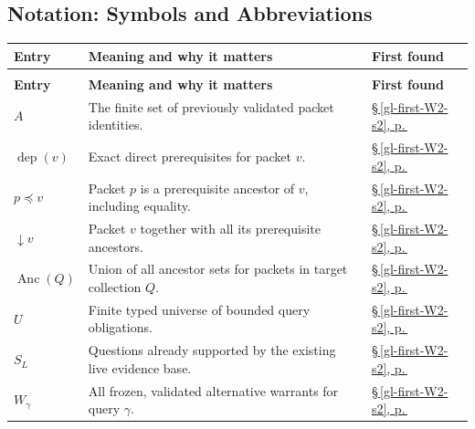\documentclass[10pt,letterpaper]{article}
\theoremstyle{definition}
\theoremstyle{remark}
\begin{document}
\subsection*{Notation: Symbols and Abbreviations}
\begingroup\small\setlength{\tabcolsep}{4pt}\renewcommand{\arraystretch}{1.16}
\begin{longtable}{@{}>{\raggedright\arraybackslash}p{.215\linewidth}>{\raggedright\arraybackslash}p{.585\linewidth}>{\raggedright\arraybackslash}p{.14\linewidth}@{}}
\toprule
\textbf{Entry} & \textbf{Meaning and why it matters} & \textbf{First found} \\
\midrule\endfirsthead
\multicolumn{3}{@{}l}{\footnotesize \emph{Notation: Symbols and Abbreviations (continued)}}\\
\toprule\textbf{Entry} & \textbf{Meaning and why it matters} & \textbf{First found} \\
\midrule\endhead
\bottomrule\endfoot
\textbf{$A$} & The finite set of previously validated packet identities. & \hyperref[gl-first-W2-s2]{\S\,\ref*{gl-first-W2-s2}, p.\,\pageref*{gl-first-W2-s2}} \\
\textbf{$\operatorname{dep}(v)$} & Exact direct prerequisites for packet $v$. & \hyperref[gl-first-W2-s2]{\S\,\ref*{gl-first-W2-s2}, p.\,\pageref*{gl-first-W2-s2}} \\
\textbf{$p\preceq v$} & Packet $p$ is a prerequisite ancestor of $v$, including equality. & \hyperref[gl-first-W2-s2]{\S\,\ref*{gl-first-W2-s2}, p.\,\pageref*{gl-first-W2-s2}} \\
\textbf{$\downarrow v$} & Packet $v$ together with all its prerequisite ancestors. & \hyperref[gl-first-W2-s2]{\S\,\ref*{gl-first-W2-s2}, p.\,\pageref*{gl-first-W2-s2}} \\
\textbf{$\operatorname{Anc}(Q)$} & Union of all ancestor sets for packets in target collection $Q$. & \hyperref[gl-first-W2-s2]{\S\,\ref*{gl-first-W2-s2}, p.\,\pageref*{gl-first-W2-s2}} \\
\textbf{$U$} & Finite typed universe of bounded query obligations. & \hyperref[gl-first-W2-s2]{\S\,\ref*{gl-first-W2-s2}, p.\,\pageref*{gl-first-W2-s2}} \\
\textbf{$S_L$} & Questions already supported by the existing live evidence base. & \hyperref[gl-first-W2-s2]{\S\,\ref*{gl-first-W2-s2}, p.\,\pageref*{gl-first-W2-s2}} \\
\textbf{$W_\gamma$} & All frozen, validated alternative warrants for query $\gamma$. & \hyperref[gl-first-W2-s2]{\S\,\ref*{gl-first-W2-s2}, p.\,\pageref*{gl-first-W2-s2}} \\

\end{longtable}
\end{document}
